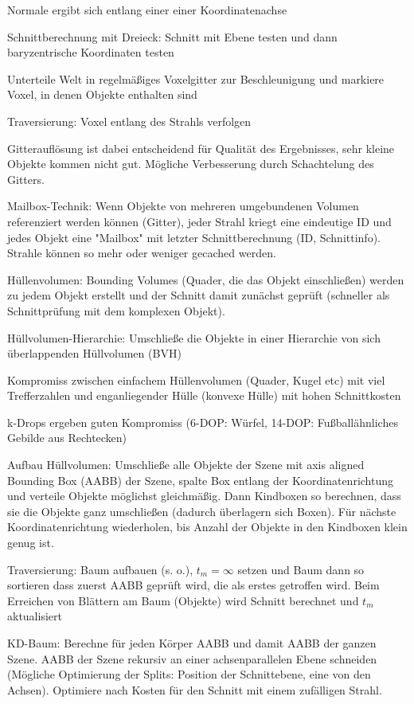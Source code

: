 \documentclass[12pt,landscape]{article}
\begin{document}
\begin{multicols}{3}
\begin{compactitem}
\item Normale ergibt sich entlang einer einer Koordinatenachse
\item Schnittberechnung mit Dreieck: Schnitt mit Ebene testen und dann baryzentrische Koordinaten testen
\item Unterteile Welt in regelmäßiges Voxelgitter zur Beschleunigung und markiere Voxel, in denen Objekte enthalten sind
\item Traversierung: Voxel entlang des Strahls verfolgen
\item Gitterauflösung ist dabei entscheidend für Qualität des Ergebnisses, sehr kleine Objekte kommen nicht gut. Mögliche Verbesserung durch Schachtelung des Gitters.
\item Mailbox-Technik: Wenn Objekte von mehreren umgebundenen Volumen referenziert werden können (Gitter), jeder Strahl kriegt eine eindeutige ID und jedes Objekt eine "Mailbox" mit letzter Schnittberechnung (ID, Schnittinfo). Strahle können so mehr oder weniger gecached werden.
\item Hüllenvolumen: Bounding Volumes (Quader, die das Objekt einschließen) werden zu jedem Objekt erstellt und der Schnitt damit zunächst geprüft (schneller als Schnittprüfung mit dem komplexen Objekt).
\item Hüllvolumen-Hierarchie: Umschließe die Objekte in einer Hierarchie von sich überlappenden Hüllvolumen (BVH)
\item Kompromiss zwischen einfachem Hüllenvolumen (Quader, Kugel etc) mit viel Trefferzahlen und enganliegender Hülle (konvexe Hülle) mit hohen Schnittkosten
\item k-Drops ergeben guten Kompromiss (6-DOP: Würfel, 14-DOP: Fußballähnliches Gebilde aus Rechtecken)
\item Aufbau Hüllvolumen: Umschließe alle Objekte der Szene mit axis aligned Bounding Box (AABB) der Szene, spalte Box entlang der Koordinatenrichtung und verteile Objekte möglichst gleichmäßig. Dann Kindboxen so berechnen, dass sie die Objekte ganz umschließen (dadurch überlagern sich Boxen). Für nächste Koordinatenrichtung wiederholen, bis Anzahl der Objekte in den Kindboxen klein genug ist.
\item Traversierung: Baum aufbauen (s. o.), $t_m = \infty$ setzen und Baum dann so sortieren dass zuerst AABB geprüft wird, die als erstes getroffen wird. Beim Erreichen von Blättern am Baum (Objekte) wird Schnitt berechnet und $t_m$ aktualisiert
\item KD-Baum: Berechne für jeden Körper AABB und damit AABB der ganzen Szene. AABB der Szene rekursiv an einer achsenparallelen Ebene schneiden (Mögliche Optimierung der Splits: Position der Schnittebene, eine von den Achsen). Optimiere nach Kosten für den Schnitt mit einem zufälligen Strahl.

\end{compactitem}
\end{multicols}
\end{document}
